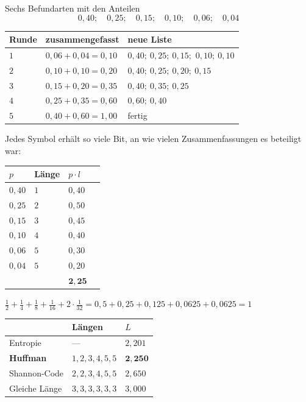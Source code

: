 \begin{merksatz}
Sechs Befundarten mit den Anteilen
\[ 0{,}40; \quad 0{,}25; \quad 0{,}15; \quad 0{,}10; \quad 0{,}06; \quad 0{,}04 \]

\begin{center}
{\small
\renewcommand{\arraystretch}{1.48}
\begin{tabular}{@{}P{1.1cm}P{3.0cm}P{3.7cm}@{}}
\toprule
\textbf{Runde} & \textbf{zusammen\-gefasst} & \textbf{neue Liste}\\
\midrule
$1$ & $0{,}06+0{,}04 = 0{,}10$ & $0{,}40;\ 0{,}25;\ 0{,}15;$ $0{,}10;\ 0{,}10$\\
$2$ & $0{,}10+0{,}10 = 0{,}20$ & $0{,}40;\ 0{,}25;\ 0{,}20;\ 0{,}15$\\
$3$ & $0{,}15+0{,}20 = 0{,}35$ & $0{,}40;\ 0{,}35;\ 0{,}25$\\
$4$ & $0{,}25+0{,}35 = 0{,}60$ & $0{,}60;\ 0{,}40$\\
$5$ & $0{,}40+0{,}60 = 1{,}00$ & fertig\\
\bottomrule
\end{tabular}}
\end{center}

Jedes Symbol erhält so viele Bit, an wie vielen Zusammenfassungen es beteiligt war:
\begin{center}
{\small
\renewcommand{\arraystretch}{1.48}
\begin{tabular}{@{}P{1.6cm}P{1.8cm}P{1.6cm}P{2.2cm}@{}}
\toprule
$p$ & \textbf{Länge} & $p\cdot l$ & \\
\midrule
$0{,}40$ & $1$ & $0{,}40$ & \\
$0{,}25$ & $2$ & $0{,}50$ & \\
$0{,}15$ & $3$ & $0{,}45$ & \\
$0{,}10$ & $4$ & $0{,}40$ & \\
$0{,}06$ & $5$ & $0{,}30$ & \\
$0{,}04$ & $5$ & $0{,}20$ & \\
\midrule
& & $\mathbf{2{,}25}$ & \\
\bottomrule
\end{tabular}}
\end{center}

 $\frac12+\frac14+\frac18+\frac1{16}+2\cdot\frac1{32} = 0{,}5+0{,}25+0{,}125+0{,}0625+0{,}0625 = 1$ \checkmark

\begin{center}
{\small
\renewcommand{\arraystretch}{1.48}
\begin{tabular}{@{}P{2.8cm}P{2.4cm}P{2.4cm}@{}}
\toprule
& \textbf{Längen} & $L$\\
\midrule
Entropie & --- & $2{,}201$\\
\textbf{Huffman} & $1,2,3,4,5,5$ & $\mathbf{2{,}250}$\\
Shannon-Code & $2,2,3,4,5,5$ & $2{,}650$\\
Gleiche Länge & $3,3,3,3,3,3$ & $3{,}000$\\
\bottomrule
\end{tabular}}
\end{center}


\end{merksatz}
